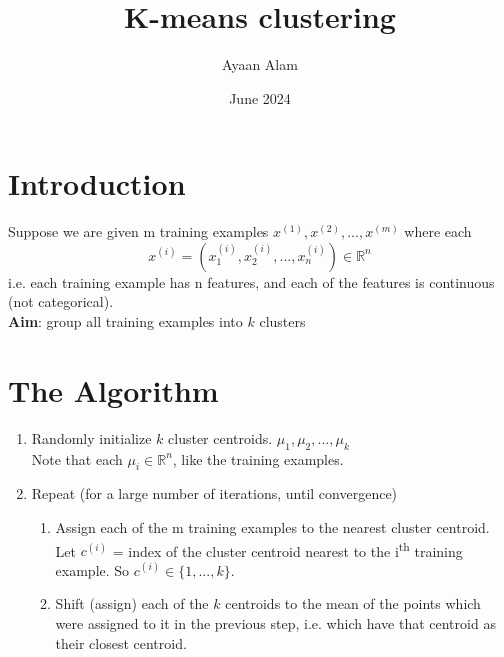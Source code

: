 \documentclass{article}
\title{K-means clustering}
\author{Ayaan Alam}
\date{June 2024}
\begin{document}
\maketitle

\section{Introduction}
Suppose we are given m training examples \(x^{(1)}, x^{(2)},..., x^{(m)}\) where each 
\[x^{(i)} = (x_1^{(i)},x_2^{(i)},...,x_n^{(i)})\in\mathbb{R}^n\]
i.e. each training example has n features, and each of the features is continuous (not categorical).
\\
\textbf{Aim}: group all training examples into \(k\) clusters
\section{The Algorithm}
\begin{enumerate}
\item Randomly initialize \(k\) cluster centroids.
\(\mu_1,\mu_2,...,\mu_k\)
\\
Note that each \(\mu_i\in\mathbb{R}^n\), like the training examples.
\item Repeat (for a large number of iterations, until convergence)
    \begin{enumerate}
    \item Assign each of the m training examples to the nearest cluster centroid.
    \\
   Let \(c^{(i)}\) = index of the cluster centroid nearest to the i\textsuperscript{th} training example. So \(c^{(i)}\in\{1,...,k\}\).
    \item Shift (assign) each of the \(k\) centroids to the mean of the points which were assigned to it in the previous step, i.e. which have that centroid as their closest centroid.
    \end{enumerate}
\end{enumerate}
\end{document}
